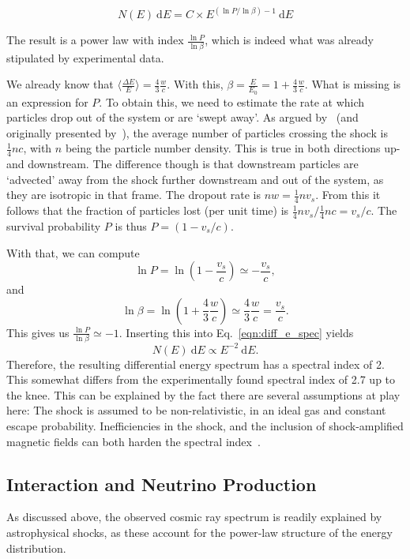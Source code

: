 \begin{equation}
    \label{eqn:diff_e_spec}
    N(E)~\text{d} E = C\times E^{(\ln P/\ln\beta)-1}~\text{d} E
\end{equation}

The result is a power law with index $\frac{\ln P}{\ln \beta}$, which is indeed what was already stipulated by experimental data.

We already know that $\big\langle\frac{\Delta E}{E}\big\rangle = \frac{4}{3}\frac{w}{c}$. With this, $\beta = \frac{E}{E_0} = 1 + \frac{4}{3}\frac{w}{c}$. What is missing is an expression for $P$. To obtain this, we need to estimate the rate at which particles drop out of the system or are `swept away'. As argued by~\cite{Longair2011} (and originally presented by~), the average number of particles crossing the shock is $\frac{1}{4} n c$, with $n$ being the particle number density. This is true in both directions up- and downstream. The difference though is that downstream particles are `advected' away from the shock further downstream and out of the system, as they are isotropic in that frame. The dropout rate is $n w=\frac{1}{4}nv_s$. From this it follows that the fraction of particles lost (per unit time) is $\frac{1}{4} n v_s/\frac{1}{4}nc = v_s/c$. The survival probability $P$ is thus $P=(1-v_s/c)$.

With that, we can compute
\begin{equation}
    \ln P = \ln ( 1-\frac{v_s}{c}) \simeq -\frac{v_s}{c},
\end{equation}
and
\begin{equation}
    \ln \beta = \ln(1+\frac{4}{3}\frac{w}{c}) \simeq \frac{4}{3}\frac{w}{c} = \frac{v_s}{c}.
\end{equation}
This gives us $\frac{\ln P}{\ln \beta} \simeq -1$. Inserting this into Eq.~\ref{eqn:diff_e_spec} yields
\begin{equation}
    N(E)~\text{d} E \propto E^{-2}~\text{d} E.
\end{equation}
Therefore, the resulting differential energy spectrum has a spectral index of 2. This somewhat differs from the experimentally found spectral index of 2.7 up to the knee. This can be explained by the fact there are several assumptions at play here: The shock is assumed to be non-relativistic, in an ideal gas and constant escape probability. Inefficiencies in the shock, and the inclusion of shock-amplified magnetic fields can both harden the spectral index~\cite{Spurio2018}.

\subsection{Interaction and Neutrino Production}\label{cr_interactions}
As discussed above, the observed cosmic ray spectrum is readily explained by astrophysical shocks, as these account for the power-law structure of the energy distribution.

